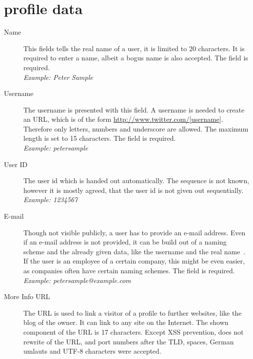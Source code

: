 \chapter{\Twitter{} profile data}
\label{chap:twitter_profile_data}

\begin{description}
\item[Name] This fields tells the real name of a user, it is limited to 20
            characters. It is required to enter a name, albeit a bogus name is
            also accepted. The field is required.\\
            \textit{Example: Peter Sample}
\item[Username] The username is presented with this field. A username is needed
                to create an URL, which is of the form \url{http://www.twitter.com/[username]}.
                Therefore only letters, numbers and underscore are allowed. The maximum length
                is set to 15 characters. The field is required.\\
                \textit{Example: petersample}
\item[User ID] The user id which is handed out automatically. The sequence is
               not known, however it is mostly agreed, that the user id is not given out
               sequentially.\\
               \textit{Example: 1234567}
\item[E-mail] Though not visible publicly, a \Twitter{} user has to provide an
              e-mail address. Even if an e-mail address is not provided, it
              can be build out of a naming scheme and the already
              given data, like the username and the real name~\cite{brown2008}. If the user
              is an employee of a certain company, this might be even easier,
              as companies often have certain naming schemes. The field is required.\\
              \textit{Example: petersample@example.com}
\item[More Info URL] The URL is used to link a visitor of a profile to further
                     websites, like the blog of the owner. It can link to
                     any site on the Internet. The shown component of the
                     URL is 17 characters. Except XSS prevention,
                     \Twitter{} does not rewrite of the URL, and port numbers
                     after the TLD, spaces, German umlauts and UTF-8 characters were
                     accepted.\\

\end{description}
